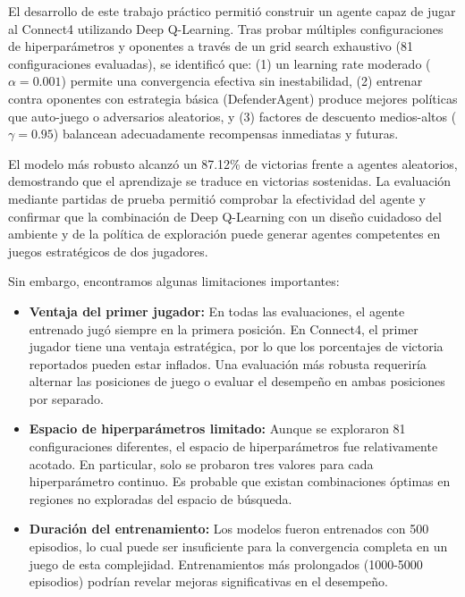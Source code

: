 \documentclass[11pt,a4paper]{article}
\begin{document}
El desarrollo de este trabajo práctico permitió construir un agente capaz de jugar al Connect4 utilizando Deep Q-Learning. Tras probar múltiples configuraciones de hiperparámetros y oponentes a través de un grid search exhaustivo (81 configuraciones evaluadas), se identificó que: (1) un learning rate moderado ($\alpha=0.001$) permite una convergencia efectiva sin inestabilidad, (2) entrenar contra oponentes con estrategia básica (DefenderAgent) produce mejores políticas que auto-juego o adversarios aleatorios, y (3) factores de descuento medios-altos ($\gamma=0.95$) balancean adecuadamente recompensas inmediatas y futuras.

El modelo más robusto alcanzó un 87.12\% de victorias frente a agentes aleatorios, demostrando que el aprendizaje se traduce en victorias sostenidas. La evaluación mediante partidas de prueba permitió comprobar la efectividad del agente y confirmar que la combinación de Deep Q-Learning con un diseño cuidadoso del ambiente y de la política de exploración puede generar agentes competentes en juegos estratégicos de dos jugadores.

Sin embargo, encontramos algunas limitaciones importantes:

\begin{itemize}
    \item \textbf{Ventaja del primer jugador:} En todas las evaluaciones, el agente entrenado jugó siempre en la primera posición. En Connect4, el primer jugador tiene una ventaja estratégica, por lo que los porcentajes de victoria reportados pueden estar inflados. Una evaluación más robusta requeriría alternar las posiciones de juego o evaluar el desempeño en ambas posiciones por separado.

    \item \textbf{Espacio de hiperparámetros limitado:} Aunque se exploraron 81 configuraciones diferentes, el espacio de hiperparámetros fue relativamente acotado. En particular, solo se probaron tres valores para cada hiperparámetro continuo. Es probable que existan combinaciones óptimas en regiones no exploradas del espacio de búsqueda.

    \item \textbf{Duración del entrenamiento:} Los modelos fueron entrenados con 500 episodios, lo cual puede ser insuficiente para la convergencia completa en un juego de esta complejidad. Entrenamientos más prolongados (1000-5000 episodios) podrían revelar mejoras significativas en el desempeño.

\end{itemize}
\end{document}
